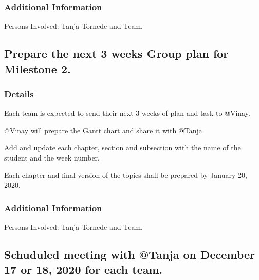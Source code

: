 \documentclass[11pt]{meetingmins} %
\begin{document}
    \subsubsection{Additional Information}
        \begin{hiddensubitems}                      
            \item
                Persons Involved: Tanja Tornede and Team.
        \end{hiddensubitems}

\subsection{Prepare the next 3 weeks Group plan for Milestone 2.}
    \subsubsection{Details}
        \begin{hiddensubitems}
            \item
                Each team is expected to send their next 3 weeks of plan and task to @Vinay.
            \item
                @Vinay will prepare the Gantt chart and share it with @Tanja.
            \item
                Add and update each chapter, section and subsection with the name of the student and the week number.
            \item
                Each chapter and final version of the topics shall be prepared by January 20, 2020.
        \end{hiddensubitems}
    
    \subsubsection{Additional Information}
        \begin{hiddensubitems}
            \item
                Persons Involved: Tanja Tornede and Team.
        \end{hiddensubitems}

\subsection{Schuduled meeting with @Tanja on December 17 or 18, 2020 for each team.}
\end{document}
